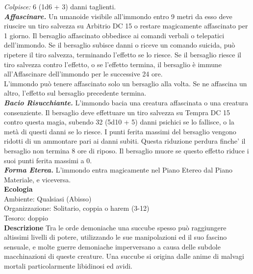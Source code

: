\begin{multicols}{2}
\emph{Colpisce:} 6 (1d6 + 3) danni taglienti.\\
\emph{\textbf{Affascinare.}} Un umanoide visibile all'immondo entro 9 metri da esso deve riuscire un tiro salvezza su Arbitrio DC 15 o restare magicamente affascinato per 1 giorno. Il bersaglio affascinato obbedisce ai comandi verbali o telepatici dell'immondo. Se il bersaglio subisce danni o riceve un comando suicida, può ripetere il tiro salvezza, terminando l'effetto se lo riesce. Se il bersaglio riesce il tiro salvezza contro l'effetto, o se l'effetto termina, il bersaglio è immune all'Affascinare dell'immondo per le successive 24 ore.\\
L'immondo può tenere affascinato solo un bersaglio alla volta. Se ne affascina un altro, l'effetto sul bersaglio precedente termina.\\
\emph{\textbf{Bacio Risucchiante.}} L'immondo bacia una creatura affascinata o una creatura consenziente. Il bersaglio deve effettuare un tiro salvezza su Tempra DC 15 contro questa magia, subendo 32 (5d10 + 5) danni psichici se lo fallisce, o la metà di questi danni se lo riesce. I punti ferita massimi del bersaglio vengono ridotti di un ammontare pari ai danni subiti. Questa riduzione perdura finche' il bersaglio non termina 8 ore di riposo. Il bersaglio muore se questo effetto riduce i suoi punti ferita massimi a 0.\\
\emph{\textbf{Forma Eterea.}} L'immondo entra magicamente nel Piano Etereo dal Piano Materiale, e viceversa.\\
\textbf{Ecologia}\\
Ambiente: Qualsiasi (Abisso)\\
Organizzazione: Solitario, coppia o harem (3-12)\\
Tesoro: doppio\\
\textbf{Descrizione}
Tra le orde demoniache una succube spesso può raggiungere altissimi livelli di potere, utilizzando le sue manipolazioni ed il suo fascino sensuale, e molte guerre demoniache imperversano a causa delle subdole macchinazioni di queste creature. Una succube si origina dalle anime di malvagi mortali particolarmente libidinosi ed avidi.\\



\end{multicols}
